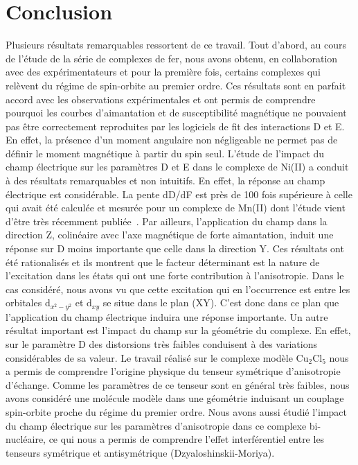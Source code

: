 \documentclass[12pt,a4paper]{report}
\numberwithin{equation}{section}
\begin{document}
\section*{Conclusion}
Plusieurs résultats remarquables ressortent de ce travail. 
Tout d’abord, au cours de l’étude de la série de complexes de fer, nous avons obtenu, en collaboration avec des expérimentateurs et pour la première fois, certains complexes qui relèvent du régime de spin-orbite au premier ordre. Ces résultats sont en parfait accord avec les observations expérimentales et ont permis de comprendre pourquoi les courbes d’aimantation et de susceptibilité magnétique ne pouvaient pas être correctement reproduites par les logiciels de fit des interactions D et E. En effet, la présence d’un moment angulaire non négligeable ne permet pas de définir le moment magnétique à partir du spin seul. 
L’étude de l’impact du champ électrique sur les paramètres D et E dans le complexe de Ni(II) a conduit à des résultats remarquables et non intuitifs. En effet, la réponse au champ électrique est considérable. La pente dD/dF est près de 100 fois supérieure à celle qui avait été calculée et mesurée pour un complexe de Mn(II) dont l’étude vient d’être très récemment publiée~\cite{vaganov_chemical_2025}. Par ailleurs, l’application du champ dans la direction Z, colinéaire avec l’axe magnétique de forte aimantation, induit une réponse sur D moins importante que celle dans la direction Y. Ces résultats ont été rationalisés et ils montrent que le facteur déterminant est la nature de l’excitation dans les états qui ont une forte contribution à l’anisotropie. Dans le cas considéré, nous avons vu que cette excitation qui en l’occurrence est entre les orbitales d$_{x^2-y^2}$ et d$_{xy}$ se situe dans le plan (XY). C’est donc dans ce plan que l’application du champ électrique induira une réponse importante. Un autre résultat important est l’impact du champ sur la géométrie du complexe. En effet, sur le paramètre D des distorsions très faibles conduisent à des variations considérables de sa valeur. 
Le travail réalisé sur le complexe modèle Cu$_2$Cl$_5$ nous a permis de comprendre l’origine physique du tenseur symétrique d’anisotropie d’échange. Comme les paramètres de ce tenseur sont en général très faibles, nous avons considéré une molécule modèle dans une géométrie induisant un couplage spin-orbite proche du régime du premier ordre. Nous avons aussi étudié l’impact du champ électrique sur les paramètres d’anisotropie dans ce complexe bi-nucléaire, ce qui nous a permis de comprendre l’effet interférentiel entre les tenseurs symétrique et antisymétrique (Dzyaloshinskii-Moriya). 
\end{document}
